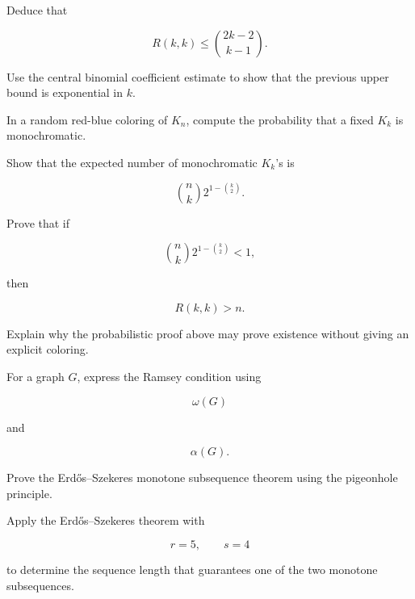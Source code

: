 \begin{exercise}[3]
Deduce that

\[
R(k,k)
\leq
\binom{2k-2}{k-1}.
\]
\end{exercise}

\begin{exercise}[3]
Use the central binomial coefficient estimate to show that the previous
upper bound is exponential in \(k\).
\end{exercise}

\begin{exercise}[3]
In a random red-blue coloring of \(K_n\), compute the probability that a
fixed \(K_k\) is monochromatic.
\end{exercise}

\begin{exercise}[3]
Show that the expected number of monochromatic \(K_k\)'s is

\[
\binom nk
2^{1-\binom{k}{2}}.
\]
\end{exercise}

\begin{exercise}[3]
Prove that if

\[
\binom nk
2^{1-\binom{k}{2}}
<1,
\]

then

\[
R(k,k)>n.
\]
\end{exercise}

\begin{exercise}[3]
Explain why the probabilistic proof above may prove existence without
giving an explicit coloring.
\end{exercise}

\begin{exercise}[3]
For a graph \(G\), express the Ramsey condition using

\[
\omega(G)
\]

and

\[
\alpha(G).
\]
\end{exercise}

\begin{exercise}[3]
Prove the Erd\H{o}s--Szekeres monotone subsequence theorem using the
pigeonhole principle.
\end{exercise}

\begin{exercise}[3]
Apply the Erd\H{o}s--Szekeres theorem with

\[
r=5,
\qquad
s=4
\]

to determine the sequence length that guarantees one of the two
monotone subsequences.
\end{exercise}

